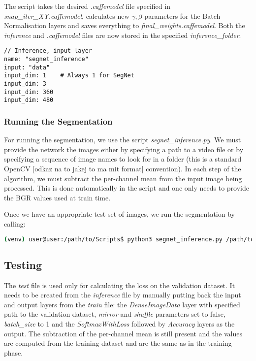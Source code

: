 The script takes the desired \textit{.caffemodel} file specified in \textit{snap\_iter\_XY.caffemodel}, calculates new $ \gamma, \beta $ parameters for the Batch Normalisation layers and saves everything to \textit{final\_weights.caffemodel}. Both the \textit{inference} and \textit{.caffemodel} files are now stored in the specified \textit{inference\_folder}.

\begin{lstlisting}
// Inference, input layer
name: "segnet_inference"
input: "data"
input_dim: 1	# Always 1 for SegNet
input_dim: 3
input_dim: 360
input_dim: 480
\end{lstlisting}

\subsubsection{Running the Segmentation}

For running the segmentation, we use the script \textit{segnet\_inference.py}. We must provide the network the images either by specifying a path to a video file or by specifying a sequence of image names to look for in a folder (this is a standard OpenCV [odkaz na to jakej to ma mit format] convention). In each step of the algorithm, we must subtract the per-channel mean from the input image being processed. This is done automatically in the script and one only needs to provide the BGR values used at train time.

Once we have an appropriate test set of images, we run the segmentation by calling:

\begin{lstlisting}[language=bash]
(venv) user@user:/path/to/Scripts$ python3 segnet_inference.py /path/to/inference.prototxt /path/to/final_weights.caffemodel /path/to/videofile.avi 
\end{lstlisting}

\subsection{Testing}

The \textit{test} file is used only for calculating the loss on the validation dataset. It needs to be created from the \textit{inference} file by manually putting back the input and output layers from the \textit{train} file: the \textit{DenseImageData} layer with specified path to the validation dataset, \textit{mirror} and \textit{shuffle} parameters set to false, \textit{batch\_size} to 1 and the \textit{SoftmaxWithLoss} followed by \textit{Accuracy} layers as the output. The subtraction of the per-channel mean is still present and the values are computed from the training dataset and are the same as in the training phase. 

